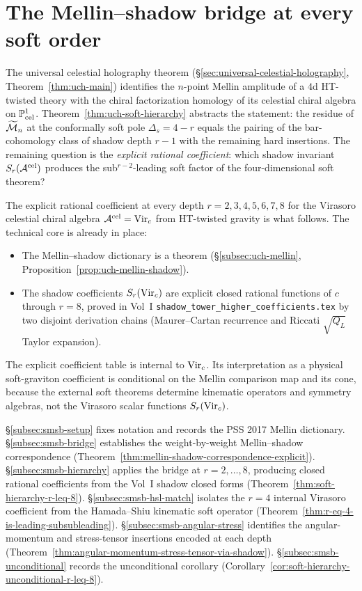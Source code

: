 \section{The Mellin--shadow bridge at every soft order}
\label{sec:soft-graviton-mellin-shadow-bridge-platonic}

\noindent
The universal celestial holography theorem
(\S\ref{sec:universal-celestial-holography},
Theorem~\ref{thm:uch-main}) identifies the $n$-point Mellin amplitude of
a $4$d HT-twisted theory with the chiral factorization homology of its
celestial chiral algebra on $\mathbb P^1_{\mathrm{cel}}$.
Theorem~\ref{thm:uch-soft-hierarchy} abstracts the statement: the
residue of $\widetilde{\mathcal M}_n$ at the conformally soft pole
$\Delta_s = 4 - r$ equals the pairing of the bar-cohomology class of
shadow depth $r - 1$ with the remaining hard insertions. The remaining
question is the \emph{explicit rational
coefficient}: which shadow invariant $S_r(\mathcal A^{\mathrm{cel}})$
produces the sub${}^{r - 2}$-leading soft factor of
the four-dimensional soft theorem?

The explicit rational coefficient at every depth
$r = 2, 3, 4, 5, 6, 7, 8$ for the Virasoro celestial chiral algebra
$\mathcal A^{\mathrm{cel}} = \mathrm{Vir}_c$ from HT-twisted gravity is what follows.
The technical core is already in place:
\begin{itemize}
\item The Mellin--shadow dictionary is a theorem
(\S\ref{subsec:uch-mellin}, Proposition~\ref{prop:uch-mellin-shadow}).
\item The shadow coefficients $S_r(\mathrm{Vir}_c)$ are explicit closed rational
functions of $c$ through $r = 8$, proved in Vol~I
\texttt{shadow\_tower\_higher\_coefficients.tex} by two disjoint
derivation chains (Maurer--Cartan recurrence and Riccati
$\sqrt{Q_L}$ Taylor expansion).
\end{itemize}
The explicit coefficient table is internal to \(\mathrm{Vir}_c\).  Its
interpretation as a physical soft-graviton coefficient is conditional
on the Mellin comparison map and its cone, because the external soft
theorems determine kinematic operators and symmetry algebras, not the
Virasoro scalar functions \(S_r(\mathrm{Vir}_c)\).

\S\ref{subsec:smsb-setup} fixes notation and records the PSS 2017
Mellin dictionary. \S\ref{subsec:smsb-bridge} establishes the
weight-by-weight Mellin--shadow correspondence
(Theorem~\ref{thm:mellin-shadow-correspondence-explicit}).
\S\ref{subsec:smsb-hierarchy} applies the bridge at $r = 2, \ldots, 8$,
producing closed rational coefficients from the Vol~I shadow closed
forms (Theorem~\ref{thm:soft-hierarchy-r-leq-8}).
\S\ref{subsec:smsb-hsl-match} isolates the $r = 4$ internal
Virasoro coefficient from the Hamada--Shiu kinematic soft operator
(Theorem~\ref{thm:r-eq-4-is-leading-subsubleading}).
\S\ref{subsec:smsb-angular-stress} identifies the angular-momentum and
stress-tensor insertions encoded at each depth
(Theorem~\ref{thm:angular-momentum-stress-tensor-via-shadow}).
\S\ref{subsec:smsb-unconditional} records the unconditional corollary
(Corollary~\ref{cor:soft-hierarchy-unconditional-r-leq-8}).

